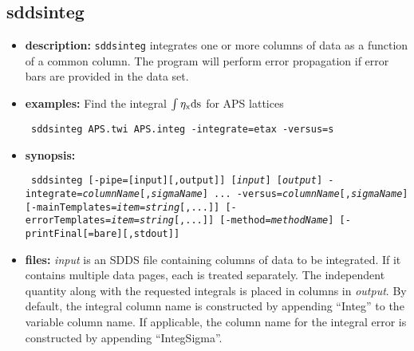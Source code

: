 \begin{latexonly}
\newpage
\end{latexonly}
\subsection{sddsinteg}
\label{sddsinteg}

\begin{itemize}
\item {\bf description:}
{\tt sddsinteg} integrates one or more columns of data as a function of a common
column.  The program will perform error propagation if error bars are provided in 
the data set.
\item {\bf examples:} 
Find the integral ${\rm \int \eta_x ds}$ for APS lattices
\begin{flushleft}{\tt
sddsinteg APS.twi APS.integ -integrate=etax -versus=s
}\end{flushleft}
\item {\bf synopsis:} 
\begin{flushleft}{\tt
sddsinteg [-pipe=[input][,output]] [{\em input}] [{\em output}]
-integrate={\em columnName}[,{\em sigmaName}] ...
-versus={\em columnName}[,{\em sigmaName}] [-mainTemplates={\em item}={\em string}[,...]] 
[-errorTemplates={\em item}={\em string}[,...]] 
[-method={\em methodName}] [-printFinal[=bare][,stdout]]
}\end{flushleft}
\item {\bf files:}
{\em input} is an SDDS file containing columns of data to be
integrated.  If it contains multiple data pages, each is treated
separately. The independent quantity along with the requested integrals
is placed in columns in {\em output}.  By default, the
integral column name is constructed by appending ``Integ'' to the
variable column name.  If applicable, the column name for the
integral error is constructed by appending ``IntegSigma''.  


\end{itemize}
